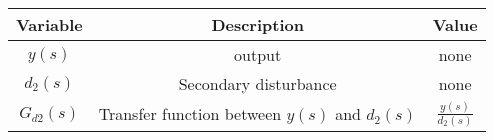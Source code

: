       \begin{tabular}{|c|c|c|} 
      \hline
\textbf{Variable}& \textbf{Description}& \textbf{Value}\\\hline
         $y(s)$& output &none\\\hline
         $d_2(s)$& Secondary disturbance &none\\\hline
         $G_{d2}(s)$&Transfer function between $y(s)$ and $d_2(s)$&$\frac{y(s)}{d_2(s)}$\\\hline
              \end{tabular}
